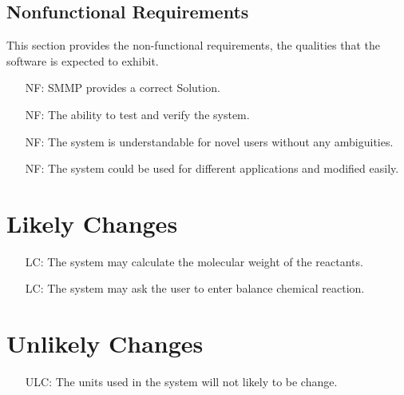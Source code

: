 \documentclass[12pt]{article}
\newcounter{reqnum} %
\newcounter{nfreqnum} %
\newcounter{lcnum} %
\newcounter{ulcnum} %
\begin{document}
\subsection{Nonfunctional Requirements}

This section provides the non-functional requirements, the qualities that the software is
expected to exhibit.\\

\noindent \begin{itemize}
\item[NF\refstepcounter{nfreqnum}\thenfreqnum \label{Correct}:]  SMMP provides a
  correct Solution.\\
\item[NF\refstepcounter{nfreqnum}\thenfreqnum \label{Verify}:]  The ability to
  test and verify the system.\\
\item[NF\refstepcounter{nfreqnum}\thenfreqnum \label{Understandability}:]  The
  system is understandable for novel users without any ambiguities.\\
\item[NF\refstepcounter{nfreqnum}\thenfreqnum \label{Usability}:]  The system
  could be used for different applications and modified easily.\\

\end{itemize}

\section{Likely Changes}    

\noindent \begin{itemize}

\item[LC\refstepcounter{lcnum}\thelcnum\label{Molecular weight}:] The system may
  calculate the molecular weight of the reactants.
\item[LC\refstepcounter{lcnum}\thelcnum\label{balance}:] The system may ask the
  user to enter balance chemical reaction.

\end{itemize}

\section{Unlikely Changes}    

\noindent \begin{itemize}

\item[ULC\refstepcounter{ulcnum}\thelcnum\label{Units}:] The units used in the
  system will not likely to be change.

\end{itemize}
\end{document}
